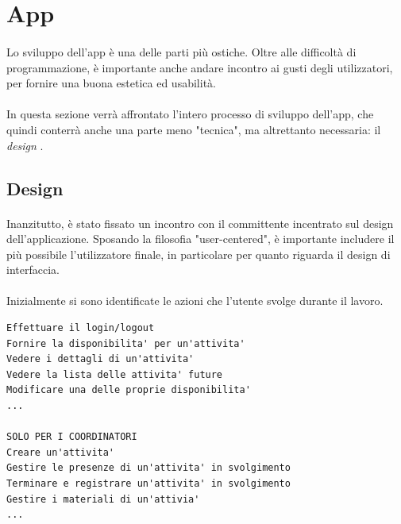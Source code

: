 \documentclass[11pt,a4paper,english]{article}
\begin{document}
\newpage
\section{App}

\paragraph{} Lo sviluppo dell'app è una delle parti più ostiche. Oltre alle difficoltà di programmazione, è importante anche andare incontro ai gusti degli utilizzatori, per fornire una buona estetica ed usabilità. 

\paragraph{} In questa sezione verrà affrontato l'intero processo di sviluppo dell'app, che quindi conterrà anche una parte meno "tecnica", ma altrettanto necessaria: il \emph{design} \cite{design}.

\subsection{Design} 

\paragraph{} Inanzitutto, è stato fissato un incontro con il committente incentrato sul design dell'applicazione. Sposando la filosofia "user-centered", è importante includere il più possibile l'utilizzatore finale, in particolare per quanto riguarda il design di interfaccia. 


\paragraph{} Inizialmente si sono identificate le azioni che l'utente svolge durante il lavoro. 

\begin{lstlisting}[title=Lista dei task]
Effettuare il login/logout
Fornire la disponibilita' per un'attivita'
Vedere i dettagli di un'attivita'
Vedere la lista delle attivita' future
Modificare una delle proprie disponibilita'
...

SOLO PER I COORDINATORI
Creare un'attivita'
Gestire le presenze di un'attivita' in svolgimento
Terminare e registrare un'attivita' in svolgimento
Gestire i materiali di un'attivia'
...
\end{lstlisting}
\end{document}
